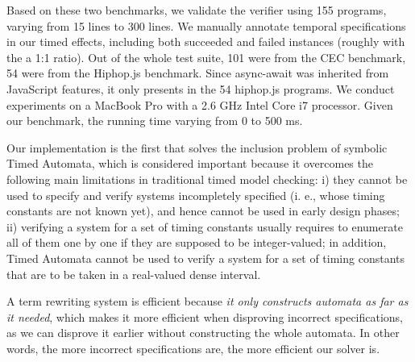 \documentclass[acmsmall,10pt,review]{acmart}
\begin{document}
{%

   

Based on these two benchmarks, we validate the verifier using 155  programs, varying from 15 lines to 300 lines. We manually annotate temporal specifications in our timed effects, including both succeeded and failed instances (roughly with the a 1:1 ratio). 
Out of the whole test suite, 101 were from the CEC benchmark, 54 were from the Hiphop.js benchmark.  Since async-await was inherited from JavaScript features, it only presents in the 54 hiphop.js programs.
We conduct experiments on a MacBook Pro with a 2.6 GHz Intel Core i7 processor. Given our benchmark, the running time varying from 0 to 500 ms. 


Our implementation is the first that solves the  inclusion problem of symbolic Timed Automata, which is considered important because it overcomes the following main limitations in traditional timed model checking:  i) they cannot be used to specify and verify systems incompletely specified (i. e., whose timing constants are not known yet), and hence cannot be used in early design phases; ii) verifying a system for a set of timing constants usually requires to enumerate all of them one by one if they are supposed to be integer-valued; in addition, Timed Automata cannot be used to verify a system for a set of timing constants that are to be taken in a real-valued dense interval. 



A term rewriting system is efficient because \emph{it only constructs automata as far as it needed}, which makes it more efficient when disproving incorrect specifications, as we can disprove it earlier without constructing the whole automata. In other words, the more incorrect specifications are, the more efficient our solver is.

}
\end{document}
